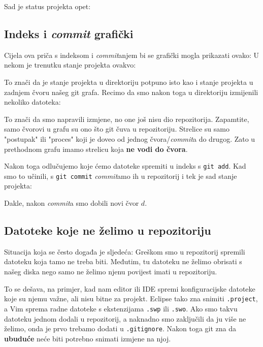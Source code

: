 Sad je status projekta opet:



\subsection*{Indeks i \emph{commit} grafički}

Cijela ova priča s indeksom i \emph{commit}anjem bi se grafički mogla prikazati ovako:
U nekom je trenutku stanje projekta ovakvo:



To znači da je stanje projekta u direktoriju potpuno isto kao i stanje projekta u zadnjem čvoru našeg git grafa.
Recimo da smo nakon toga u direktoriju izmijenili nekoliko datoteka:



To znači da smo napravili izmjene, no one još nisu dio repozitorija.
Zapamtite, samo čvorovi u grafu su ono što git čuva u repozitoriju.
Strelice su samo "postupak" ili "proces" koji je doveo od jednog čvora/\emph{commit}a do drugog.
Zato u prethodnom grafu imamo strelicu koja \textbf{ne vodi do čvora}.

Nakon toga odlučujemo koje ćemo datoteke spremiti u indeks s \verb+git add+.
Kad smo to učinili, s \verb+git commit+ \emph{commit}amo ih u repozitorij i tek je sad stanje projekta:



Dakle, nakon \emph{commit}a smo dobili novi čvor $d$.

\subsection*{Datoteke koje ne želimo u repozitoriju}

Situacija koja se često događa je sljedeća:
Greškom smo u repozitorij spremili datoteku koja tamo ne treba biti. 
Međutim, tu datoteku ne želimo obrisati s našeg diska nego samo ne želimo njenu povijest imati u repozitoriju.

To se dešava, na primjer, kad nam editor ili IDE spremi konfiguracijske datoteke koje su njemu važne, ali nisu bitne za projekt.
Eclipse tako zna snimiti \verb+.project+, a Vim sprema radne datoteke s ekstenzijama \verb+.swp+ ili \verb+.swo+.
Ako smo takvu datoteku jednom dodali u repozitorij, a naknadno smo zaključili da ju više ne želimo, onda je prvo trebamo dodati u \verb+.gitignore+.
Nakon toga git zna da \textbf{ubuduće} neće biti potrebno snimati izmjene na njoj.

